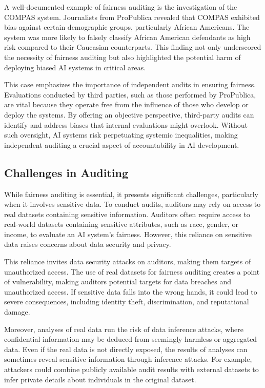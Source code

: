 \documentclass[manuscript,screen,review,anonymous]{acmart}
\begin{document}
A well-documented example of fairness auditing is the investigation of the COMPAS system. Journalists from ProPublica revealed that COMPAS exhibited bias against certain demographic groups, particularly African Americans. The system was more likely to falsely classify African American defendants as high risk compared to their Caucasian counterparts. This finding not only underscored the necessity of fairness auditing but also highlighted the potential harm of deploying biased AI systems in critical areas.

This case emphasizes the importance of independent audits in ensuring fairness. Evaluations conducted by third parties, such as those performed by ProPublica, are vital because they operate free from the influence of those who develop or deploy the systems. By offering an objective perspective, third-party audits can identify and address biases that internal evaluations might overlook. Without such oversight, AI systems risk perpetuating systemic inequalities, making independent auditing a crucial aspect of accountability in AI development.


\subsection{Challenges in Auditing}

While fairness auditing is essential, it presents significant challenges, particularly when it involves sensitive data. To conduct audits, auditors may rely on access to real datasets containing sensitive information. Auditors often require access to real-world datasets containing sensitive attributes, such as race, gender, or income, to evaluate an AI system's fairness. However, this reliance on sensitive data raises concerns about data security and privacy.

This reliance invites data security attacks on auditors, making them targets of unauthorized access. The use of real datasets for fairness auditing creates a point of vulnerability, making auditors potential targets for data breaches and unauthorized access. If sensitive data falls into the wrong hands, it could lead to severe consequences, including identity theft, discrimination, and reputational damage.

Moreover, analyses of real data run the risk of data inference attacks, where confidential information may be deduced from seemingly harmless or aggregated data. Even if the real data is not directly exposed, the results of analyses can sometimes reveal sensitive information through inference attacks. For example, attackers could combine publicly available audit results with external datasets to infer private details about individuals in the original dataset.
\end{document}

